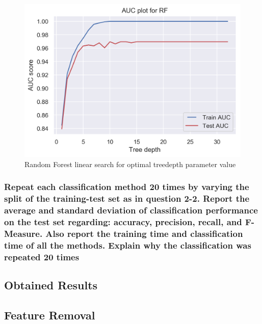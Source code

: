 \begin{figure}[!ht]
 \centering
\includegraphics[width=6.1in]{assignment2/2-3-b-rf(Treedepth).png}
\caption{\label{fig:rftreedepth} Random Forest linear search for optimal treedepth parameter value}
\end{figure}




\subsubsection{Repeat each classification method 20 times by varying the split of the training-test set as in question 2-2. Report the average and standard deviation of classification performance on the test set regarding: accuracy, precision, recall, and F- Measure. Also report the training time and classification time of all the methods. Explain why the classification was repeated 20 times}



\subsection{Obtained Results}



\subsection{Feature Removal}
